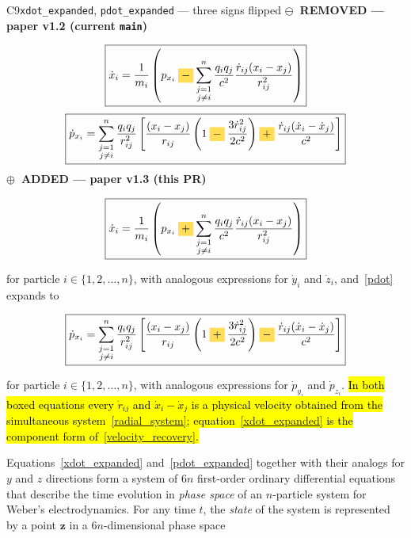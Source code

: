 \documentclass[12pt,a4paper]{article}
\theoremstyle{definition}
\theoremstyle{remark}
\newcommand{\oldtag}{{\sffamily\bfseries\footnotesize
  \textcolor{oldink}{$\ominus$~REMOVED \textnormal{\textmd{— paper v1.2 (current \texttt{main})}}}}\par\smallskip}
\newcommand{\newtag}{{\sffamily\bfseries\footnotesize
  \textcolor{newink}{$\oplus$~ADDED \textnormal{\textmd{— paper v1.3 (this PR)}}}}\par\smallskip}
\newcommand{\dins}[1]{\hl{#1}}
\newcommand{\sgn}[1]{\mathbin{\colorbox{sigbg}{$#1$}}}
\newcommand{\eqnote}[1]{\par\smallskip{\footnotesize\sffamily\textcolor{barink}{#1}}\par}
\begin{document}
\begin{diffbox}{C9}{\texttt{xdot\_expanded}, \texttt{pdot\_expanded} --- three signs flipped}
\oldtag
\begin{equation*}
    \boxed{\dot{x}_i = \frac{1}{m_i} \left(p_{x_i} \sgn{-} \sum_{\substack{j=1 \\ j \neq i}}^{n} \frac{q_i q_j}{c^2} \frac{\dot{r}_{ij} (x_i - x_j)}{r_{ij}^2}\right)}
\end{equation*}
\begin{equation*}
    \boxed{\dot{p}_{x_i} = \sum_{\substack{j=1 \\ j \neq i}}^{n} \frac{q_i q_j}{r_{ij}^2}\left[\frac{(x_i - x_j)}{r_{ij}}\left(1 \sgn{-} \frac{3\dot{r}_{ij}^2}{2 c^2}\right) \sgn{+} \frac{\dot{r}_{ij}(\dot{x}_i - \dot{x}_j)}{c^2}\right]}
\end{equation*}
\tcblower
\newtag
\begin{equation}\label{xdot_expanded}
    \boxed{\dot{x}_i = \frac{1}{m_i} \left(p_{x_i} \sgn{+} \sum_{\substack{j=1 \\ j \neq i}}^{n} \frac{q_i q_j}{c^2} \frac{\dot{r}_{ij} (x_i - x_j)}{r_{ij}^2}\right)}
\end{equation}

for particle $i \in \{1, 2, \ldots, n\}$, with analogous expressions for $\dot{y}_i$ and $\dot{z}_i$, and~\eqref{pdot} expands to

\begin{equation}\label{pdot_expanded}
    \boxed{\dot{p}_{x_i} = \sum_{\substack{j=1 \\ j \neq i}}^{n} \frac{q_i q_j}{r_{ij}^2}\left[\frac{(x_i - x_j)}{r_{ij}}\left(1 \sgn{+} \frac{3\dot{r}_{ij}^2}{2 c^2}\right) \sgn{-} \frac{\dot{r}_{ij}(\dot{x}_i - \dot{x}_j)}{c^2}\right]}
\end{equation}

for particle $i \in \{1, 2, \ldots, n\}$, with analogous expressions for $\dot{p}_{y_i}$ and $\dot{p}_{z_i}$. \dins{In both boxed equations every \mbox{$\dot{r}_{ij}$} and \mbox{$\dot{x}_i - \dot{x}_j$} is a physical velocity obtained from the simultaneous system~\mbox{\eqref{radial_system}}; equation~\mbox{\eqref{xdot_expanded}} is the component form of~\mbox{\eqref{velocity_recovery}}.}
\eqnote{These are the $n$-body forms of C5 and C6 and carry the same three sign
changes. Both remain boxed as the paper's headline results.}
\end{diffbox}

Equations~\eqref{xdot_expanded} and~\eqref{pdot_expanded} together with their analogs for $y$ and $z$ directions form a system of $6n$ first-order ordinary differential equations that describe the time evolution in \textit{phase space} of an $n$-particle system for Weber's electrodynamics. For any time $t$, the \textit{state} of the system is represented by a point $\mathbf{z}$ in a $6n$-dimensional phase space
\end{document}
